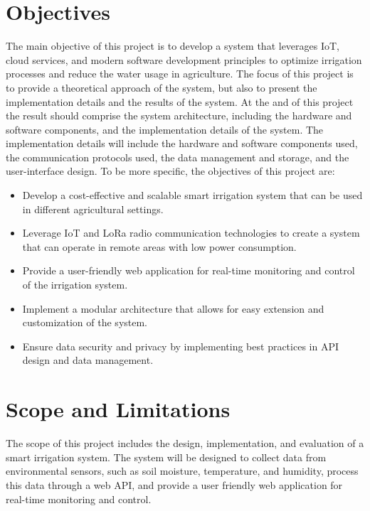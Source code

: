 \section{Objectives}
The main objective of this project is to develop a system that leverages IoT, cloud services, and modern software development
principles to optimize irrigation processes and reduce the water usage in agriculture. The focus of this project is to provide
a theoretical approach of the system, but also to present the implementation details and the results of the system. At the and 
of this project the result should comprise the system architecture, including the hardware and software components, and 
the implementation details of the system. The implementation details will include the hardware and software components used,
the communication protocols used, the data management and storage, and the user-interface design.
To be more specific, the objectives of this project are:
\begin{itemize}
    \item Develop a cost-effective and scalable smart irrigation system that can be used in different agricultural settings.
    \item Leverage IoT and LoRa radio communication technologies to create a system that can operate in remote areas with low power consumption.
    \item Provide a user-friendly web application for real-time monitoring and control of the irrigation system.
    \item Implement a modular architecture that allows for easy extension and customization of the system.
    \item Ensure data security and privacy by implementing best practices in API design and data management.
\end{itemize}

\section{Scope and Limitations}

The scope of this project includes the design, implementation, and evaluation of a smart irrigation system. 
The system will be designed to collect data from environmental sensors, such as soil moisture, temperature, and humidity,
process this data through a web API, and provide a user friendly web application for real-time monitoring and control.


